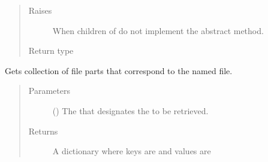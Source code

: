 \documentclass[letterpaper,10pt,english]{sphinxmanual}
\begin{document}
\begin{fulllineitems}
\begin{fulllineitems}
\begin{quote}
\begin{description}
\begin{itemize}
\end{itemize}

\item[{Raises}] \leavevmode
{} \textendash{} When children of  do not implement the abstract method.

\item[{Return type}] \leavevmode
{}

\end{description}\end{quote}

\end{fulllineitems}


\begin{fulllineitems}
\label{\detokenize{app.domain:app.domain.network_nodes.Node.get_file_parts}}
Gets collection of file parts that correspond to the named file.
\begin{quote}\begin{description}
\item[{Parameters}] \leavevmode
{} () \textendash{} The {\hyperref[\detokenize{app.domain.helpers:app.domain.helpers.smart_dataclasses.FileData.name}]{}} that
designates the {\hyperref[\detokenize{app.domain.helpers:app.domain.helpers.smart_dataclasses.FileBlockData}]{}}
to be retrieved.

\item[{Returns}] \leavevmode
A dictionary where keys are {\hyperref[\detokenize{app.domain.helpers:app.domain.helpers.smart_dataclasses.FileBlockData.number}]{}} and
values are {\hyperref[\detokenize{app.domain.helpers:app.domain.helpers.smart_dataclasses.FileBlockData}]{}}


\end{description}
\end{quote}
\end{fulllineitems}
\end{fulllineitems}
\end{document}
